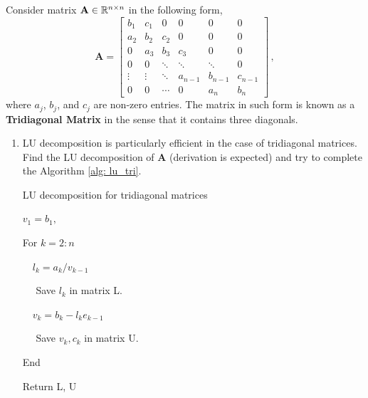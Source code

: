\documentclass[english,onecolumn]{IEEEtran}
\begin{document}
\noindent Consider matrix ${\bf A} \in \mathbb{R}^{n\times n}$ in the following form,
\[
\mathbf{A} = 
\begin{bmatrix}
	b_1 & c_1 &  0  &  0 & 0  & 0 \\
	a_2 & b_2 & c_2 &  0 & 0  & 0 \\
	0   & a_3 & b_3 & c_3 & 0 & 0 \\
	0   & 0 & \ddots & \ddots& \ddots&0\\
	\vdots & \vdots & \ddots& a_{n-1}& b_{n-1}& c_{n-1}\\
	0 & 0 & \cdots & 0 & a_{n} & b_n 
\end{bmatrix}\,,
\]
where $a_j$, $b_j$, and $c_j$ are non-zero entries.
The matrix in such form is known as a \textbf{Tridiagonal Matrix} in the sense that it contains three diagonals.
\begin{enumerate}
	\item LU decomposition is particularly efficient in the case of tridiagonal matrices. Find the LU decomposition of $\mathbf{A}$ (derivation is expected) and try to complete the Algorithm \ref{alg: lu_tri}.
\begin{algorithm}[htbp]
\label{alg: lu_tri}
\caption{LU decomposition for tridiagonal matrices}
\SetAlgoLined
{}

$v_{1}=b_1,$

For $k=2: n$

$\quad l_{k}=a_{k} / v_{k-1}$

$\quad$	Save $l_k$ in matrix L.

$\quad v_{k}=b_{k}-l_{k} e_{k-1}$

$\quad$	Save $v_k, c_k$ in matrix U.

End

Return L, U
\end{algorithm}




\end{enumerate}
\end{document}
